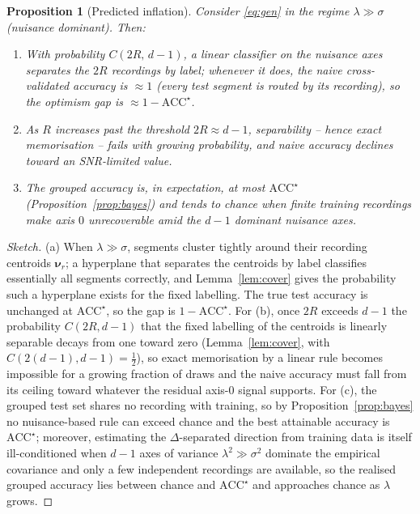 \documentclass[11pt]{article}
\newtheorem{proposition}{Proposition}
\begin{document}
\begin{proposition}[Predicted inflation]
\label{prop:infl}
Consider \eqref{eq:gen} in the regime $\lambda\gg\sigma$ (nuisance dominant). Then:
\begin{enumerate}
\item[(a)] With probability $C(2R,\,d{-}1)$, a linear classifier on the nuisance axes separates the $2R$ recordings by label; whenever it does, the naive cross-validated accuracy is $\approx 1$ (every test segment is routed by its recording), so the optimism gap is $\approx 1-\mathrm{ACC}^\star$.
\item[(b)] As $R$ increases past the threshold $2R\approx d{-}1$, separability -- hence exact memorisation -- fails with growing probability, and naive accuracy declines toward an SNR-limited value.
\item[(c)] The grouped accuracy is, in expectation, at most $\mathrm{ACC}^\star$ (Proposition~\ref{prop:bayes}) and tends to chance when finite training recordings make axis $0$ unrecoverable amid the $d{-}1$ dominant nuisance axes.
\end{enumerate}
\end{proposition}
\begin{proof}[Sketch]
(a) When $\lambda\gg\sigma$, segments cluster tightly around their recording centroids $\boldsymbol{\nu}_r$; a hyperplane that separates the centroids by label classifies essentially all segments correctly, and Lemma~\ref{lem:cover} gives the probability such a hyperplane exists for the fixed labelling. The true test accuracy is unchanged at $\mathrm{ACC}^\star$, so the gap is $1-\mathrm{ACC}^\star$. For (b), once $2R$ exceeds $d{-}1$ the probability $C(2R,d{-}1)$ that the fixed labelling of the centroids is linearly separable decays from one toward zero (Lemma~\ref{lem:cover}, with $C(2(d{-}1),d{-}1)=\tfrac12$), so exact memorisation by a linear rule becomes impossible for a growing fraction of draws and the naive accuracy must fall from its ceiling toward whatever the residual axis-$0$ signal supports. For (c), the grouped test set shares no recording with training, so by Proposition~\ref{prop:bayes} no nuisance-based rule can exceed chance and the best attainable accuracy is $\mathrm{ACC}^\star$; moreover, estimating the $\Delta$-separated direction from training data is itself ill-conditioned when $d{-}1$ axes of variance $\lambda^2\gg\sigma^2$ dominate the empirical covariance and only a few independent recordings are available, so the realised grouped accuracy lies between chance and $\mathrm{ACC}^\star$ and approaches chance as $\lambda$ grows.
\end{proof}
\end{document}
